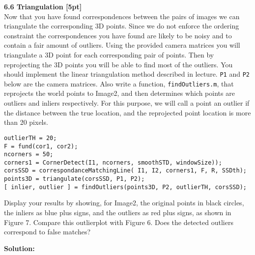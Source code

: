 \documentclass{assignment}
\begin{document}
\begin{problemlist}
\textbf{6.6 Triangulation [5pt]}\\
Now that you have found correspondences between the pairs of images we can triangulate the corresponding 3D points. Since we do not enforce the ordering constraint the correspondences you have found are likely to be noisy and to contain a fair amount of outliers. Using the provided camera matrices you will triangulate a 3D point for each corresponding pair of points. Then by reprojecting the 3D points you will be able to find most of the outliers. You should implement the linear triangulation method described in lecture. \texttt{P1} and \texttt{P2} below are the camera matrices. Also write a function, \texttt{findOutliers.m}, that reprojects the world points to Image2, and then determines which points are outliers and inliers respectively. For this purpose, we will call a point an outlier if the distance between the true location, and the reprojected point location is more than 20 pixels.\\
\begin{lstlisting}
outlierTH = 20;
F = fund(cor1, cor2);
ncorners = 50;
corners1 = CornerDetect(I1, ncorners, smoothSTD, windowSize));
corsSSD = correspondanceMatchingLine( I1, I2, corners1, F, R, SSDth);
points3D = triangulate(corsSSD, P1, P2);
[ inlier, outlier ] = findOutliers(points3D, P2, outlierTH, corsSSD);
\end{lstlisting}
Display your results by showing, for Image2, the original points in black circles, the inliers as blue plus signs, and the outliers as red plus signs, as shown in Figure 7. Compare this outlierplot with Figure 6. Does the detected outliers correspond to false matches?

\textbf{Solution:}
        

\newpage
{}
\lstset{
numbers=left
}



\end{problemlist}
\end{document}
